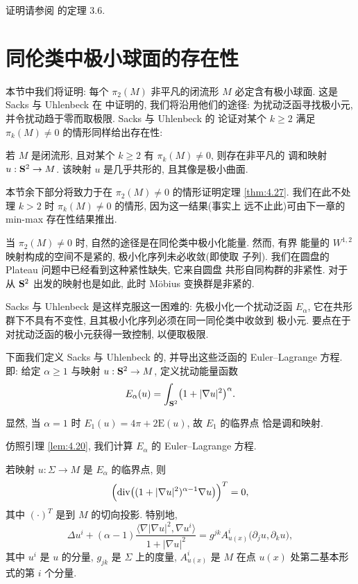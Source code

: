 证明请参阅 \cite{ScYa2} 的定理 3.6.

\section{同伦类中极小球面的存在性}
\label{sec:4.6}

本节中我们将证明: 每个 $\pi_2(M)$ 非平凡的闭流形 $M$ 必定含有极小球面.
这是 Sacks 与 Uhlenbeck 在 \cite{SaUh} 中证明的, 我们将沿用他们的途径:
为扰动泛函寻找极小元, 并令扰动趋于零而取极限. Sacks 与 Uhlenbeck 的
论证对某个 $k\geq2$ 满足 $\pi_k(M)\neq0$ 的情形同样给出存在性:

\begin{theorem}
\label{thm:4.27}
若 $M$ 是闭流形, 且对某个 $k\geq2$ 有 $\pi_k(M)\neq0$, 则存在非平凡的
调和映射 $u:\mathbf{S}^2\to M$. 该映射 $u$ 是几乎共形的, 且其像是极小曲面.
\end{theorem}

本节余下部分将致力于在 $\pi_2(M)\neq0$ 的情形证明定理 \ref{thm:4.27}.
我们在此不处理 $k>2$ 时 $\pi_k(M)\neq0$ 的情形, 因为这一结果(事实上
远不止此)可由下一章的 min-max 存在性结果推出.

当 $\pi_2(M)\neq0$ 时, 自然的途径是在同伦类中极小化能量. 然而, 有界
能量的 $W^{1,2}$ 映射构成的空间不是紧的, 极小化序列未必收敛(即使取
子列). 我们在圆盘的 Plateau 问题中已经看到这种紧性缺失, 它来自圆盘
共形自同构群的非紧性. 对于从 $\mathbf{S}^2$ 出发的映射也是如此, 此时 M\"obius
变换群是非紧的.

Sacks 与 Uhlenbeck 是这样克服这一困难的: 先极小化一个扰动泛函
$E_\alpha$, 它在共形群下不具有不变性, 且其极小化序列必须在同一同伦类中收敛到
极小元. 要点在于对扰动泛函的极小元获得一致控制, 以便取极限.

下面我们定义 Sacks 与 Uhlenbeck 的, 并导出这些泛函的
Euler--Lagrange 方程. 即: 给定 $\alpha\geq1$ 与映射 $u:\mathbf{S}^2\to M$,
定义扰动能量函数
\begin{equation}
E_\alpha(u)=\int_{\mathbf{S}^2}\bigl(1+|\nabla u|^2\bigr)^\alpha.
\label{eq:4.61}
\end{equation}

显然, 当 $\alpha=1$ 时 $E_1(u)=4\pi+2\mathrm{E}(u)$, 故 $E_1$ 的临界点
恰是调和映射.

仿照引理 \ref{lem:4.20}, 我们计算 $E_\alpha$ 的 Euler--Lagrange 方程.

\begin{lemma}
\label{lem:4.28}
若映射 $u:\Sigma\to M$ 是 $E_\alpha$ 的临界点, 则
\begin{equation}
\Bigl(\operatorname{div}\bigl((1+|\nabla u|^2)^{\alpha-1}\nabla u\bigr)\Bigr)^T=0,
\label{eq:4.62}
\end{equation}
其中 $(\cdot)^T$ 是到 $M$ 的切向投影. 特别地,
\begin{equation}
\Delta u^i+(\alpha-1)
 \frac{\bigl\langle\nabla|\nabla u|^2,\nabla u^i\bigr\rangle}
      {1+|\nabla u|^2}
 =g^{jk}A^i_{u(x)}\bigl(\partial_ju,\partial_ku\bigr),
\label{eq:4.63}
\end{equation}
其中 $u^i$ 是 $u$ 的分量, $g_{jk}$ 是 $\Sigma$ 上的度量,
$A^i_{u(x)}$ 是 $M$ 在点 $u(x)$ 处第二基本形式的第 $i$ 个分量.
\end{lemma}

